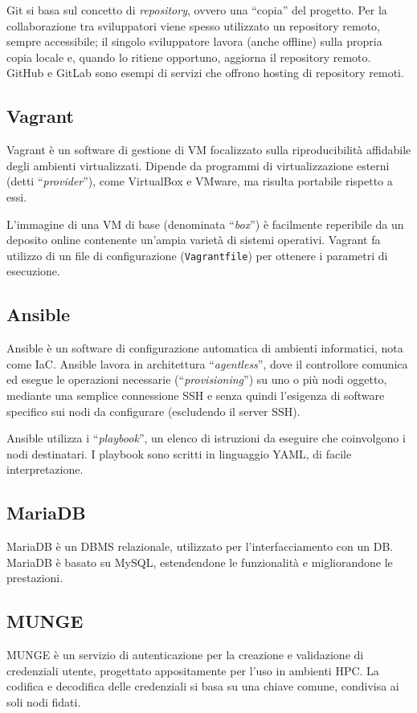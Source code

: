 \documentclass[12pt,a4paper,twoside,openright]{book}
\begin{document}
Git si basa sul concetto di \textit{repository}, ovvero una ``copia'' del progetto. Per la collaborazione tra sviluppatori viene spesso utilizzato un repository remoto, sempre accessibile; il singolo sviluppatore lavora (anche offline) sulla propria copia locale e, quando lo ritiene opportuno, aggiorna il repository remoto. GitHub e GitLab sono esempi di servizi che offrono hosting di repository remoti.

\subsection{Vagrant}
Vagrant è un software di gestione di \ac{VM} focalizzato sulla riproducibilità affidabile degli ambienti virtualizzati. Dipende da programmi di virtualizzazione esterni (detti ``\textit{provider}''), come VirtualBox e VMware, ma risulta portabile rispetto a essi.

L'immagine di una \ac{VM} di base (denominata ``\textit{box}'') è facilmente reperibile da un deposito online contenente un'ampia varietà di sistemi operativi. Vagrant fa utilizzo di un file di configurazione (\texttt{Vagrantfile}) per ottenere i parametri di esecuzione.

\subsection{Ansible}
Ansible è un software di configurazione automatica di ambienti informatici, nota come \ac{IaC}. Ansible lavora in architettura ``\textit{agentless}'', dove il controllore comunica ed esegue le operazioni necessarie (``\textit{provisioning}'') su uno o più nodi oggetto, mediante una semplice connessione \ac{SSH} e senza quindi l'esigenza di software specifico sui nodi da configurare (escludendo il server \ac{SSH}).

Ansible utilizza i ``\textit{playbook}'', un elenco di istruzioni da eseguire che coinvolgono i nodi destinatari. I playbook sono scritti in linguaggio \ac{YAML}, di facile interpretazione.

\subsection{MariaDB}
MariaDB è un \ac{DBMS} relazionale, utilizzato per l'interfacciamento con un \ac{DB}. MariaDB è basato su MySQL, estendendone le funzionalità e migliorandone le prestazioni.

\subsection{MUNGE}
\ac{MUNGE} è un servizio di autenticazione per la creazione e validazione di credenziali utente, progettato appositamente per l'uso in ambienti \ac{HPC}. La codifica e decodifica delle credenziali si basa su una chiave comune, condivisa ai soli nodi fidati.
\end{document}

